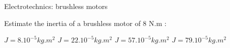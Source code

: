 \documentclass{webquiz}
\begin{document}
   \begin{question}
        
	 \begin{center}
	\large{Electrotechnics: brushless motors}
\end{center}

 Estimate the inertia of a brushless motor of 8 N.m : 

     \begin{choice}
      \incorrect  $J = 8.10^{-5} kg.m^2$    
      \incorrect  $J = 22.10^{-5} kg.m^2$    
     \correct  $J = 57.10^{-5} kg.m^2$    
      \incorrect  $J =79.10^{-5} kg.m^2$    
     \end{choice} 
    
   \end{question}

     
\end{document}
